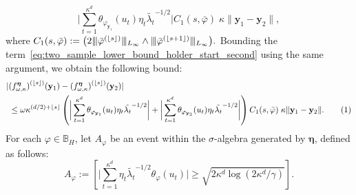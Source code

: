 \documentclass[twoside,11pt]{article}
\newcommand\numberthis{\addtocounter{equation}{1}\tag{\theequation}}
\newcommand{\floor}[1]{\lfloor #1 \rfloor} %
\newcommand{\vectorize}[1]{\mathbf{#1}}
\newcommand{\dimDensity}{d} %
\newcommand{\smoothness}{s}
\newcommand{\ONset}{\mathbb{B}}
\newcommand{\maxErrorTypeOne}{\gamma} %
\newcommand{\binNum}{\kappa}           %
\newcommand{\coef}{\theta}
\begin{document}
\begin{appendix}
\begin{itemize}
\begin{equation*}
		\bigg|
		\sum_{t=1}^{\binNum^{\dimDensity}}
		\coef_{\varphi_{\vectorize{y}_1}}(u_t)
		\eta_t
		\tilde{\lambda_t}^{-1/2}
		\bigg|
		C_1(\smoothness, \bar{\varphi})
		\;
		\binNum
		\|\vectorize{y}_1 - \vectorize{y}_2\|,
	\end{equation*}
	where $C_1(\smoothness, \bar{\varphi}) := 
	\bigl(
	2 
	\vert\kern-0.25ex
	\vert\kern-0.25ex
	\vert
	\bar{\varphi}^{(\floor{s})}
	\vert\kern-0.25ex
	\vert\kern-0.25ex
	\vert_{L_\infty}
	\wedge
	\vert\kern-0.25ex
	\vert\kern-0.25ex
	\vert
	\bar{\varphi}^{(\floor{s+1})}
	\vert\kern-0.25ex
	\vert\kern-0.25ex
	\vert_{L_\infty}
	\bigr).
	$
	Bounding the term~\eqref{eq:two_sample_lower_bound_holder_start_second} using the same argument, we obtain the following bound:
	\begin{align*}
		&|
		{(f^{{\boldsymbol{\eta}}}_{\omega, \binNum})}^{ (\floor{s})}(\vectorize{y}_1)
		-
		{(f^{{\boldsymbol{\eta}}}_{\omega, \binNum})}^{ (\floor{s})}(\vectorize{y}_2)
		|
		\\&~\leq
		\omega
		\kappa^{(\dimDensity/2) + \floor{s}}
		\left(
		\bigg|
		\sum_{t=1}^{\binNum^{\dimDensity}}
		\coef_{\varphi_{\vectorize{y}_1}}(u_t)
		\eta_t
		\tilde{\lambda_t}^{-1/2}
		\bigg|
		+
		\bigg|
		\sum_{t=1}^{\binNum^{\dimDensity}}
		\coef_{\varphi_{\vectorize{y}_2}}(u_t)
		\eta_t
		\tilde{\lambda_t}^{-1/2}
		\bigg|
		\right)
		C_1(\smoothness, \bar{\varphi})\;
		\kappa
		\|\vectorize{y}_1-\vectorize{y}_2\|.
		\numberthis
		\label{holder_lipschitz_final_bound_start}
	\end{align*}
	For each \( \varphi \in \ONset_{H} \), let \( A_{\varphi} \) be an event within the \( \sigma \)-algebra generated by \( \boldsymbol{\eta} \), defined as follows:
	\begin{equation}\label{holder_event}
		A_{\varphi}:= \left[ \big|  \sum_{t=1}^{\binNum^{\dimDensity}} \eta_t \tilde{\lambda_t}^{-1/2} \coef_{\varphi}(u_t) \bigr|
		\geq
		\sqrt{2 \binNum^\dimDensity \log (2 \binNum^\dimDensity / \maxErrorTypeOne )} \right].  
	\end{equation}
	

\end{itemize}
\end{appendix}
\end{document}
